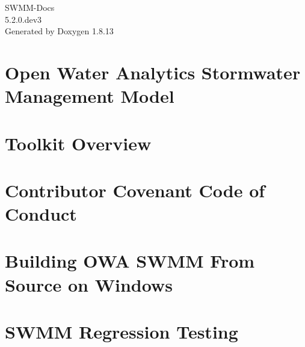 \documentclass[twoside]{book}
\newcommand{\+}{\discretionary{\mbox{\scriptsize$\hookleftarrow$}}{}{}}
\newcommand{\clearemptydoublepage}{%
  \newpage{\pagestyle{empty}\cleardoublepage}%
}
\begin{document}
\hypersetup{pageanchor=false,
             bookmarksnumbered=true,
             pdfencoding=unicode
            }
\begin{titlepage}
\vspace*{7cm}
\begin{center}%
{\Large S\+W\+M\+M-\/\+Docs \\[1ex]\large 5.\+2.\+0.\+dev3 }\\
\vspace*{1cm}
{\large Generated by Doxygen 1.8.13}\\
\end{center}
\end{titlepage}
\clearemptydoublepage
{}
\tableofcontents
\clearemptydoublepage
{}
\hypersetup{pageanchor=true}

\chapter{Open Water Analytics Stormwater Management Model}
\label{index}\hypertarget{index}{}
\chapter{Toolkit Overview}
\label{toolkit-overview}

\chapter{Contributor Covenant Code of Conduct}
\label{md__c_1__p_r_o_j_e_c_t_c_o_d_e__stormwater-_management-_model__8github__c_o_d_e__o_f__c_o_n_d_u_c_t}

\chapter{Building O\+WA S\+W\+MM From Source on Windows}
\label{md__c_1__p_r_o_j_e_c_t_c_o_d_e__stormwater-_management-_model__8github__c_o_n_t_r_i_b_u_t_i_n_g}

\chapter{S\+W\+MM Regression Testing}
\label{md__c_1__p_r_o_j_e_c_t_c_o_d_e__stormwater-_management-_model__8github__r_e_g_r_e_s_s_i_o_n__t_e_s_t_i_n_g}

\end{document}
